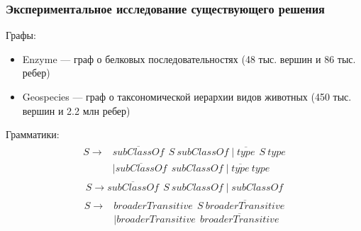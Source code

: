 \documentclass{beamer}
\begin{document}
\begin{frame}
  \transwipe[direction=90]
  \frametitle{Экспериментальное исследование существующего решения}
  Графы:
  \begin{itemize}
    \item Enzyme --- граф о белковых последовательностях (48 тыс. вершин и 86 тыс. ребер)
    \item Geospecies --- граф о таксономической иерархии видов животных (450 тыс. вершин и 2.2 млн ребер)
\end{itemize}
Грамматики:
\begin{align}
\begin{split}
\label{eqn:g_1}
S \to & \overline{\textit{subClassOf}} \ \ S \ \textit{subClassOf} \mid \overline{\textit{type}} \ \ S \ \textit{type}\\   & \mid \overline{\textit{subClassOf}} \ \ \textit{subClassOf} \mid \overline{\textit{type}} \ \textit{type}
\end{split}
\end{align}
\begin{align}
\label{eqn:g_2}
S \to \overline{\textit{subClassOf}} \ \ S \ \textit{subClassOf} \mid \textit{subClassOf}
\end{align}
\begin{align}
\begin{split}
\label{eqn:geo}
S \to & \textit{broaderTransitive} \ \  S \ \overline{\textit{broaderTransitive}} \\
      & \mid \textit{broaderTransitive} \ \  \overline{\textit{broaderTransitive}}
\end{split}
\end{align}
\end{frame}
\end{document}
